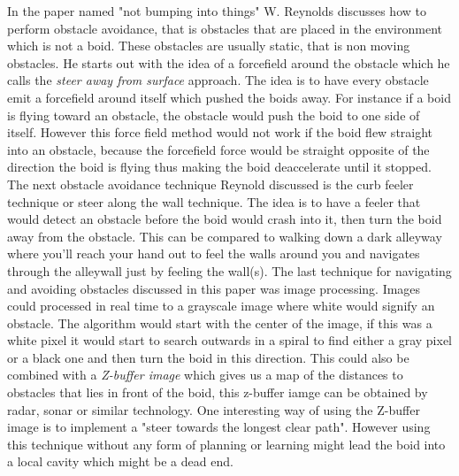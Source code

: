 In the paper named "not bumping into things" W. Reynolds discusses how to perform obstacle avoidance, that is obstacles that are placed in the environment which is not a boid. These obstacles are usually static, that is non moving obstacles. He starts out with the idea of a forcefield around the obstacle which he calls the \textit{steer away from surface} approach. The idea is to have every obstacle emit a forcefield around itself which pushed the boids away. For instance if a boid is flying toward an obstacle, the obstacle would push the boid to one side of itself. However this force field method would not work if the boid flew straight into an obstacle, because the forcefield force would be straight opposite of the direction the boid is flying thus making the boid deaccelerate until it stopped.
The next obstacle avoidance technique Reynold discussed is the curb feeler technique or steer along the wall technique. The idea is to have a feeler that would detect an obstacle before the boid would crash into it, then turn the boid away from the obstacle. This can be compared to walking down a dark alleyway where you'll reach your hand out to feel the walls around you and navigates through the alleywall just by feeling the wall(s).
The last technique for navigating and avoiding obstacles discussed in this paper was image processing. Images could processed in real time to a grayscale image where white would signify an obstacle. The algorithm would start with the center of the image, if this was a white pixel it would start to search outwards in a spiral to find either a gray pixel or a black one and then turn the boid in this direction. This could also be combined with a \textit{Z-buffer image} which gives us a map of the distances to obstacles that lies in front of the boid, this z-buffer iamge can be obtained by radar, sonar or similar technology. One interesting way of using the Z-buffer image is to implement a "steer towards the longest clear path". However using this technique without any form of planning or learning might lead the boid into a local cavity which might be a dead end.

